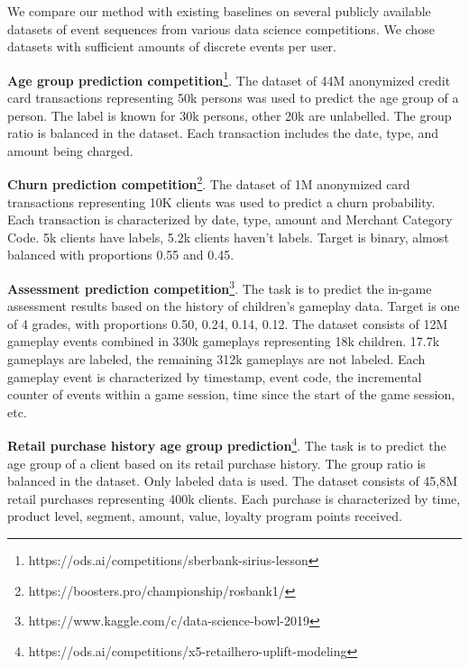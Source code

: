 \documentclass[sigconf, anonymous]{acmart}
\begin{document}
We compare our method with existing baselines on several publicly available datasets of event sequences from various data science competitions. We chose datasets with sufficient amounts of discrete events per user.

\textbf{Age group prediction competition}\footnote{https://ods.ai/competitions/sberbank-sirius-lesson}. The dataset of 44M an\-onymized credit card transactions representing 50k persons was used to predict the age group of a person. The label is known for 30k persons, other 20k are unlabelled. The group ratio is balanced in the dataset. Each transaction includes the date, type, and amount being charged.


\textbf{Churn prediction competition}\footnote{https://boosters.pro/championship/rosbank1/}. The dataset of 1M an\-onymiz\-ed card transactions representing 10K clients was used to predict a churn probability. Each transaction is characterized by date, type, amount and Merchant Category Code. 5k clients have labels, 5.2k clients haven't labels. Target is binary, almost balanced with proportions 0.55 and 0.45.

\textbf{Assessment prediction competition}\footnote{https://www.kaggle.com/c/data-science-bowl-2019}.  The task is to predict the in-game assessment results based on the history of children's gameplay data. Target is one of 4 grades, with proportions 0.50, 0.24, 0.14, 0.12. The dataset consists of 12M gameplay events combined in 330k gameplays representing 18k children. 17.7k gameplays are labeled, the remaining 312k gameplays are not labeled. Each gameplay event is characterized by timestamp, event code, the incremental counter of events within a game session, time since the start of the game session, etc.

\textbf{Retail purchase history age group prediction}\footnote{https://ods.ai/competitions/x5-retailhero-uplift-modeling}. The task is to predict the age group of a client based on its retail purchase history. The group ratio is balanced in the dataset. Only labeled data is used. The dataset consists of 45,8M retail purchases representing 400k clients. Each purchase is characterized by time, product level, segment, amount, value, loyalty program points received.
\end{document}

